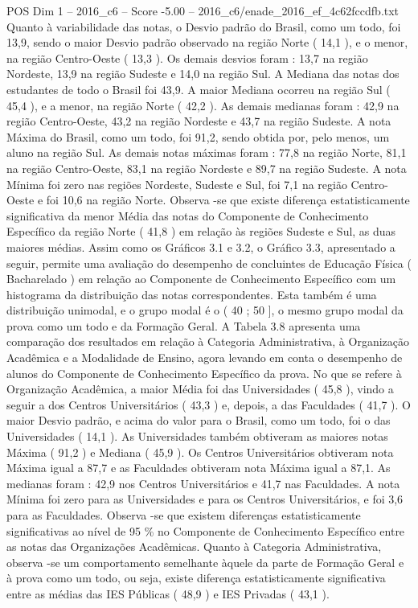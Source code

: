 \begin{textsample}{POS Dim 1 – 2016\_c6 – Score -5.00 – 2016\_c6/enade\_2016\_ef\_4c62fccdfb.txt}
Quanto à variabilidade das notas, o Desvio padrão do Brasil, como um todo, foi 13,9, sendo o maior Desvio padrão observado na região Norte ( 14,1 ), e o menor, na região Centro-Oeste ( 13,3 ).
Os demais desvios foram : 13,7 na região Nordeste, 13,9 na região Sudeste e 14,0 na região Sul.
A Mediana das notas dos estudantes de todo o Brasil foi 43,9.
A maior Mediana ocorreu na região Sul ( 45,4 ), e a menor, na região Norte ( 42,2 ).
As demais medianas foram : 42,9 na região Centro-Oeste, 43,2 na região Nordeste e 43,7 na região Sudeste.
A nota Máxima do Brasil, como um todo, foi 91,2, sendo obtida por, pelo menos, um aluno na região Sul.
As demais notas máximas foram : 77,8 na região Norte, 81,1 na região Centro-Oeste, 83,1 na região Nordeste e 89,7 na região Sudeste.
A nota Mínima foi zero nas regiões Nordeste, Sudeste e Sul, foi 7,1 na região Centro-Oeste e foi 10,6 na região Norte.
Observa -se que existe diferença estatisticamente significativa da menor Média das notas do Componente de Conhecimento Específico da região Norte ( 41,8 ) em relação às regiões Sudeste e Sul, as duas maiores médias.
Assim como os Gráficos 3.1 e 3.2, o Gráfico 3.3, apresentado a seguir, permite uma avaliação do desempenho de concluintes de Educação Física ( Bacharelado ) em relação ao Componente de Conhecimento Específico com um histograma da distribuição das notas correspondentes.
Esta também é uma distribuição unimodal, e o grupo modal é o ( 40 ; 50 ], o mesmo grupo modal da prova como um todo e da Formação Geral.
A Tabela 3.8 apresenta uma comparação dos resultados em relação à Categoria Administrativa, à Organização Acadêmica e a Modalidade de Ensino, agora levando em conta o desempenho de alunos do Componente de Conhecimento Específico da prova.
No que se refere à Organização Acadêmica, a maior Média foi das Universidades ( 45,8 ), vindo a seguir a dos Centros Universitários ( 43,3 ) e, depois, a das Faculdades ( 41,7 ).
O maior Desvio padrão, e acima do valor para o Brasil, como um todo, foi o das Universidades ( 14,1 ).
As Universidades também obtiveram as maiores notas Máxima ( 91,2 ) e Mediana ( 45,9 ).
Os Centros Universitários obtiveram nota Máxima igual a 87,7 e as Faculdades obtiveram nota Máxima igual a 87,1.
As medianas foram : 42,9 nos Centros Universitários e 41,7 nas Faculdades.
A nota Mínima foi zero para as Universidades e para os Centros Universitários, e foi 3,6 para as Faculdades.
Observa -se que existem diferenças estatisticamente significativas ao nível de 95 \% no Componente de Conhecimento Específico entre as notas das Organizações Acadêmicas.
Quanto à Categoria Administrativa, observa -se um comportamento semelhante àquele da parte de Formação Geral e à prova como um todo, ou seja, existe diferença estatisticamente significativa entre as médias das IES Públicas ( 48,9 ) e IES Privadas ( 43,1 ).

\end{textsample}
